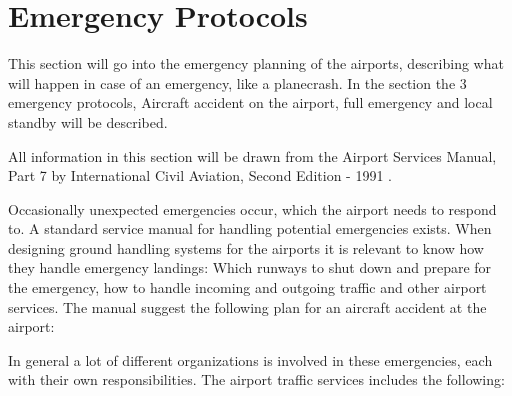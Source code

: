 \section{Emergency Protocols}

This section will go into the emergency planning of the airports, describing what will happen in case of an emergency, like a planecrash. In the section the 3 emergency protocols, Aircraft accident on the airport, full emergency and local standby will be described. 

All information in this section will be drawn from the Airport Services Manual, Part 7 by International Civil Aviation, Second Edition - 1991 \cite{Emegency_ICAO}.


Occasionally unexpected emergencies occur, which the airport needs to respond to. A standard service manual for handling potential emergencies exists. When designing ground handling systems for the airports it is relevant to know how they handle emergency landings: Which runways to shut down and prepare for the emergency, how to handle incoming and outgoing traffic and other airport services.
The manual suggest the following plan for an aircraft accident at the airport:


In general a lot of different organizations is involved in these emergencies, each with their own responsibilities. The airport traffic services includes the following:

